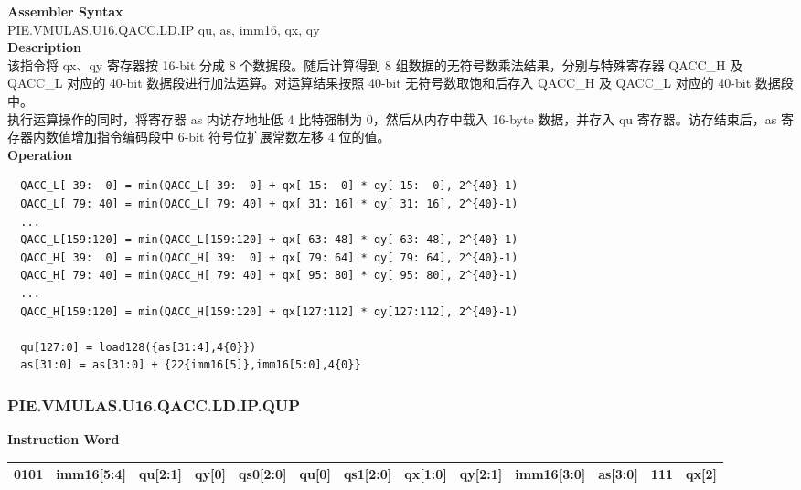 \textbf{Assembler Syntax} \\
PIE.VMULAS.U16.QACC.LD.IP qu, as, imm16, qx, qy \\
\textbf{Description} \\
该指令将 qx、qy 寄存器按 16-bit 分成 8 个数据段。随后计算得到 8 组数据的无符号数乘法结果，分别与特殊寄存器 QACC\_H 及 QACC\_L 对应的 40-bit 数据段进行加法运算。对运算结果按照 40-bit 无符号数取饱和后存入 QACC\_H 及 QACC\_L 对应的 40-bit 数据段中。\\
执行运算操作的同时，将寄存器 as 内访存地址低 4 比特强制为 0，然后从内存中载入 16-byte 数据，并存入 qu 寄存器。访存结束后，as 寄存器内数值增加指令编码段中 6-bit 符号位扩展常数左移 4 位的值。\\
\textbf{Operation}
\begin{lstlisting}
  QACC_L[ 39:  0] = min(QACC_L[ 39:  0] + qx[ 15:  0] * qy[ 15:  0], 2^{40}-1)
  QACC_L[ 79: 40] = min(QACC_L[ 79: 40] + qx[ 31: 16] * qy[ 31: 16], 2^{40}-1)
  ...
  QACC_L[159:120] = min(QACC_L[159:120] + qx[ 63: 48] * qy[ 63: 48], 2^{40}-1)
  QACC_H[ 39:  0] = min(QACC_H[ 39:  0] + qx[ 79: 64] * qy[ 79: 64], 2^{40}-1)
  QACC_H[ 79: 40] = min(QACC_H[ 79: 40] + qx[ 95: 80] * qy[ 95: 80], 2^{40}-1)
  ...
  QACC_H[159:120] = min(QACC_H[159:120] + qx[127:112] * qy[127:112], 2^{40}-1)

  qu[127:0] = load128({as[31:4],4{0}})
  as[31:0] = as[31:0] + {22{imm16[5]},imm16[5:0],4{0}}
\end{lstlisting}

\newpage
\subsubsection{PIE.VMULAS.U16.QACC.LD.IP.QUP}\label{instruction:PIEVMULASU16QACCLDIPQUP}
\setlength\tabcolsep{5pt}
\textbf{Instruction Word} \\
\begin{tabular}{|c|c|c|c|c|c|c|c|c|c|c|c|c|}
	\hline
	0101 & imm16[5:4] & qu[2:1] & qy[0] & qs0[2:0] & qu[0] & qs1[2:0] & qx[1:0] & qy[2:1] & imm16[3:0] & as[3:0] & 111 & qx[2] \\
	\hline
\end{tabular}

